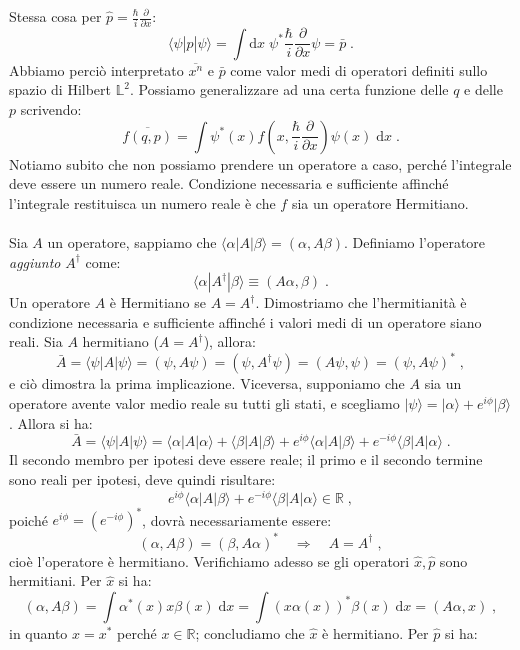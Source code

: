 \documentclass[10pt,a4paper]{report}
\theoremstyle{definition}
\numberwithin{equation}{section}
\newcommand{\diff}[1][]{\mathrm{d}#1}
\newcommand{\bra}{\langle}
\newcommand{\ket}{\rangle}
\begin{document}
Stessa cosa per $\hat{p}=\frac{\hbar}{i}\frac{\partial}{\partial x}$:
$$
\bra\psi|\hat{p}|\psi\ket=\int\diff{x}\; \psi^*\frac{\hbar}{i}\frac{\partial}{\partial x}\psi=\bar{p}\;.
$$
Abbiamo perciò interpretato $\overline{x^n}$ e $\bar{p}$ come valor medi di operatori definiti sullo spazio di Hilbert $\mathbb{L}^2$. Possiamo generalizzare ad una certa funzione delle $q$ e delle $p$ scrivendo:
\begin{equation}
\overline{f(q,p)}=\int \psi^*(x)f\left(x,\frac{\hbar}{i}\frac{\partial}{\partial x}\right)\psi(x)\;\diff{x}\;.
\end{equation}
Notiamo subito che non possiamo prendere un operatore a caso, perché l'integrale deve essere un numero reale. Condizione necessaria e sufficiente affinché l'integrale restituisca un numero reale è che $f$ sia un operatore Hermitiano. \\
\\
Sia $A$ un operatore, sappiamo che $\bra\alpha|A|\beta\ket=(\alpha,A\beta)$. Definiamo l'operatore \textit{aggiunto} $A^{\dagger}$ come:
\begin{equation}
\bra\alpha|A^{\dagger}|\beta\ket \equiv (A\alpha,\beta)\;.
\end{equation}
Un operatore $A$ è Hermitiano se $A=A^{\dagger}$. Dimostriamo che l'hermitianità è condizione necessaria e sufficiente affinché i valori medi di un operatore siano reali. Sia $A$ hermitiano ($A=A^{\dagger}$), allora:
$$
\bar{A}=\bra\psi|A|\psi\ket=(\psi,A\psi)=(\psi,A^{\dagger}\psi)=(A\psi,\psi)=(\psi,A\psi)^*\;,
$$
e ciò dimostra la prima implicazione. Viceversa, supponiamo che $A$ sia un operatore avente valor medio reale su tutti gli stati, e scegliamo $|\psi\ket=|\alpha\ket+e^{i\phi}|\beta\ket$. Allora si ha:
$$
\bar{A}=\bra\psi|A|\psi\ket=\bra\alpha|A|\alpha\ket+\bra\beta|A|\beta\ket+e^{i\phi}\bra\alpha|A|\beta\ket+e^{-i\phi}\bra\beta|A|\alpha\ket\;.
$$
Il secondo membro per ipotesi deve essere reale; il primo e il secondo termine sono reali per ipotesi, deve quindi risultare:
$$
e^{i\phi}\bra\alpha|A|\beta\ket+e^{-i\phi}\bra\beta|A|\alpha\ket \in \mathbb{R}\;,
$$
poiché $e^{i\phi}=(e^{-i\phi})^*$, dovrà necessariamente essere:
$$
(\alpha,A\beta)=(\beta,A\alpha)^*\quad  \Longrightarrow\quad  A=A^{\dagger}\;,
$$
cioè l'operatore è hermitiano. Verifichiamo adesso se gli operatori $\hat{x},\hat{p}$ sono hermitiani. Per $\hat{x}$ si ha:
$$
(\alpha,A\beta)=\int \alpha^*(x)x\beta(x)\;\diff{x}=\int(x\alpha(x))^*\beta(x)\;\diff{x}=(A\alpha,x)\;,
$$
in quanto $x=x^*$ perché $x\in\mathbb{R}$; concludiamo che $\hat{x}$ è hermitiano. Per $\hat{p}$ si ha:
\end{document}
